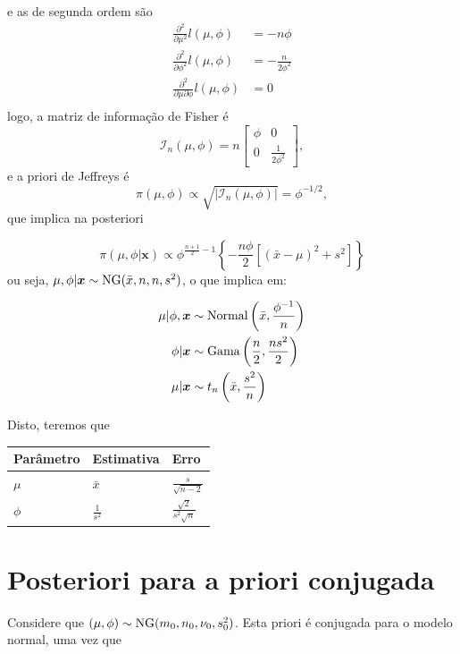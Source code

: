 \documentclass[
  letterpaper,
  DIV=11,
  numbers=noendperiod]{scrreprt}
\theoremstyle{plain}
\theoremstyle{definition}
\theoremstyle{definition}
\theoremstyle{remark}
\begin{document}
e as de segunda ordem são \[\begin{align}
\frac{\partial^2}{\partial \mu^2}l(\mu,\phi)&=-n\phi\\
\frac{\partial^2}{\partial \phi^2}l(\mu,\phi)&=-\frac{n}{2\phi^2}\\
\frac{\partial^2}{\partial \mu\partial \phi}l(\mu,\phi)&=0\\
\end{align}
\] logo, a matriz de informação de Fisher é
\[\mathcal{I}_n(\mu,\phi)=n\left[\begin{array}{cc}\phi & 0 \\0 & \frac{1}{2\phi^2}\end{array}\right],\]
e a priori de Jeffreys é
\[\pi(\mu,\phi)\propto \sqrt{|\mathcal{I}_n(\mu,\phi)|}=\phi^{-1/2},\]
que implica na posteriori

\[\pi(\mu,\phi|\boldsymbol{x})\propto \phi^{\frac{n+1}{2}-1}\left\{-\frac{n\phi}{2}\left[(\bar{x}-\mu)^2 +s^2 \right]\right\}\]
ou seja, \(\mu,\phi|\boldsymbol{x}\sim\hbox{NG}(\bar{x},n,n,s^2)\), o
que implica em:

\[\begin{align}
\mu|\phi,\boldsymbol{x}&\sim\hbox{Normal}\left(\bar{x},\frac{\phi^{-1}}{n}\right)\\
\phi|\boldsymbol{x}&\sim\hbox{Gama}\left(\frac{n}{2},\frac{ns^2}{2}\right)\\
\mu|\boldsymbol{x}&\sim t_{n}\left(\bar{x},\frac{s^2}{n}\right)
\end{align}\]

Disto, teremos que

\begin{longtable}[]{@{}lll@{}}
\toprule\noalign{}
Parâmetro & Estimativa & Erro \\
\midrule\noalign{}
\endhead
\bottomrule\noalign{}
\endlastfoot
\(\mu\) & \(\bar{x}\) & \(\frac{s}{\sqrt{n-2}}\) \\
\(\phi\) & \(\frac{1}{s^{2}}\) & \(\frac{\sqrt{2}}{s^2\sqrt{n}}\) \\
\end{longtable}

\section{Posteriori para a priori
conjugada}\label{posteriori-para-a-priori-conjugada}

Considere que \((\mu,\phi)\sim \hbox{NG}(m_0,n_0,\nu_0,s^2_0)\). Esta
priori é conjugada para o modelo normal, uma vez que
\end{document}
